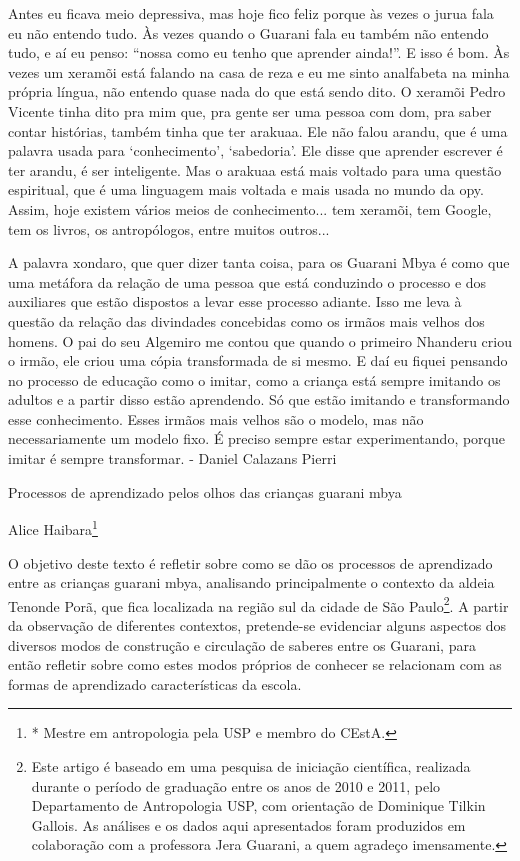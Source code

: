 \documentclass{article}
\begin{document}
Antes eu ficava meio depressiva, mas hoje fico feliz porque \`as vezes o
jurua fala eu n\~ao entendo tudo. \`As vezes quando o Guarani fala eu
tamb\'em n\~ao entendo tudo, e a\'i eu penso: {\textquotedblleft}nossa
como eu tenho que aprender ainda!{\textquotedblright}. E isso \'e bom.
\`As vezes um xeram\~oi est\'a falando na casa de reza e eu me sinto
analfabeta na minha pr\'opria l\'ingua, n\~ao entendo quase nada do que
est\'a sendo dito. O xeram\~oi Pedro Vicente tinha dito pra mim que,
pra gente ser uma pessoa com dom, pra saber contar hist\'orias,
tamb\'em tinha que ter arakuaa. Ele n\~ao falou arandu, que \'e uma
palavra usada para {\textquoteleft}conhecimento{\textquoteright},
{\textquoteleft}sabedoria{\textquoteright}. Ele disse que aprender
escrever \'e ter arandu, \'e ser inteligente. Mas o arakuaa est\'a mais
voltado para uma quest\~ao espiritual, que \'e uma linguagem mais
voltada e mais usada no mundo da opy. Assim, hoje existem v\'arios
meios de conhecimento... tem xeram\~oi, tem Google, tem os livros, os
antrop\'ologos, entre muitos outros...

A palavra xondaro, que quer dizer tanta coisa, para os Guarani Mbya \'e
como que uma met\'afora da rela\c{c}\~ao de uma pessoa que est\'a
conduzindo o processo e dos auxiliares que est\~ao dispostos a levar
esse processo adiante. Isso me leva \`a quest\~ao da rela\c{c}\~ao das
divindades concebidas como os irm\~aos mais velhos dos homens. O pai do
seu Algemiro me contou que quando o primeiro Nhanderu criou o irm\~ao,
ele criou uma c\'opia transformada de si mesmo. E da\'i eu fiquei
pensando no processo de educa\c{c}\~ao como o imitar, como a
crian\c{c}a est\'a sempre imitando os adultos e a partir disso est\~ao
aprendendo. S\'o que est\~ao imitando e transformando esse
conhecimento. Esses irm\~aos mais velhos s\~ao o modelo, mas n\~ao
necessariamente um modelo fixo. \'E preciso sempre estar
experimentando, porque imitar \'e sempre transformar. - Daniel Calazans
Pierri 

Processos de aprendizado pelos olhos das crian\c{c}as guarani mbya

Alice Haibara\footnote{* Mestre em antropologia pela USP e membro do
CEstA.}

O objetivo deste texto \'e refletir sobre como se d\~ao os processos de
aprendizado entre as crian\c{c}as guarani mbya, analisando
principalmente o contexto da aldeia Tenonde Por\~a, que fica localizada
na regi\~ao sul da cidade de S\~ao Paulo\footnote{ Este artigo \'e
baseado em uma pesquisa de inicia\c{c}\~ao cient\'ifica, realizada
durante o per\'iodo de gradua\c{c}\~ao entre os anos de 2010 e 2011,
pelo Departamento de Antropologia USP, com orienta\c{c}\~ao de
Dominique Tilkin Gallois. As an\'alises e os dados aqui apresentados
foram produzidos em colabora\c{c}\~ao com a professora Jera Guarani, a
quem agrade\c{c}o imensamente.}. A partir da observa\c{c}\~ao de
diferentes contextos, pretende-se evidenciar alguns aspectos dos
diversos modos de constru\c{c}\~ao e circula\c{c}\~ao de saberes entre
os Guarani, para ent\~ao refletir sobre como estes modos pr\'oprios de
conhecer se relacionam com as formas de aprendizado caracter\'isticas
da escola.
\end{document}
